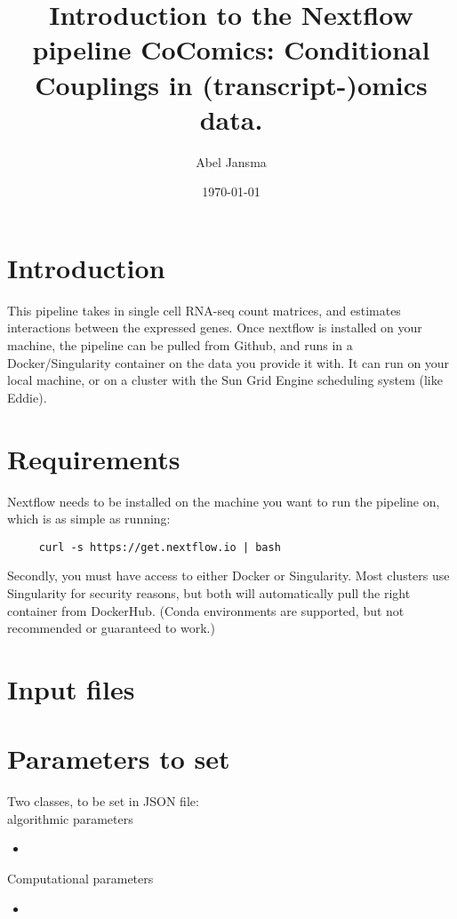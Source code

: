 \documentclass[11pt]{report}
\title{Introduction to the Nextflow pipeline \textbf{CoComics}: Conditional Couplings in (transcript-)omics data.}
\author{Abel Jansma}
\date{\today}
\begin{document}
\maketitle

\section{Introduction}
This pipeline takes in single cell RNA-seq count matrices, and estimates interactions between the expressed genes. Once nextflow is installed on your machine, the pipeline can be pulled from Github, and runs in a Docker/Singularity container on the data you provide it with. It can run on your local machine, or on a cluster with the Sun Grid Engine scheduling system (like Eddie). 


\section{Requirements}
Nextflow needs to be installed on the machine you want to run the pipeline on, which is as simple as running:

\begin{verbatim}
	 curl -s https://get.nextflow.io | bash
\end{verbatim}

Secondly, you must have access to either Docker or Singularity. Most clusters use Singularity for security reasons, but both will automatically pull the right container from DockerHub. (Conda environments are supported, but not recommended or guaranteed to work.)

\section{Input files}



\section{Parameters to set}

Two classes, to be set in JSON file: \\


algorithmic parameters
\begin{itemize}
	\item 
\end{itemize}

Computational parameters
\begin{itemize}
	\item 
\end{itemize}
\end{document}
